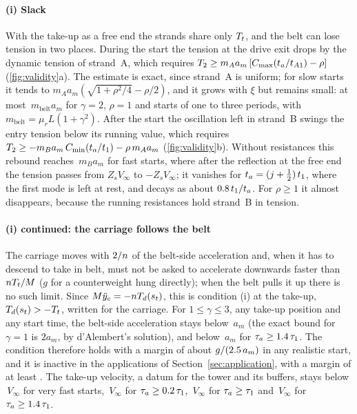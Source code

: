 \paragraph{(i) Slack} With the take-up as a free end the strands share only $T_t$, and the belt
can lose tension in two places. During the start the tension at the drive exit drops by the
dynamic tension of strand~A, which requires $T_2\ge m_Aa_m\,[C_\mathrm{max}(t_a/t_{A1})-\rho]$
(\cref{fig:validity}a). The estimate is exact, since strand~A is uniform; for slow starts it tends
to $m_Aa_m(\sqrt{1+\rho^2/4}-\rho/2)$, and it grows with $\xi$ but remains small: at most
\NumValidityExitMax\,$m_\mathrm{belt}a_m$ for $\gamma=2$, $\rho=1$ and starts of one to three
periods, with $m_\mathrm{belt}=\mu_rL(1+\gamma^2)$. After the start the oscillation left in
strand~B swings the entry tension below its running value, which requires
$T_2\ge-m_Ba_m\,C_\mathrm{min}(t_a/t_{1})-\rho\,m_Aa_m$ (\cref{fig:validity}b). Without
resistances this rebound reaches \NumReboundMax\,$m_Ba_m$ for fast starts, where after the
reflection at the free end the tension passes from $Z_sV_\infty$ to $-Z_sV_\infty$; it vanishes for
$t_a=(j+\tfrac12)\,t_{1}$, where the first mode is left at rest, and decays as about
$0.8\,t_{1}/t_a$. For $\rho\ge1$ it almost disappears, because the running resistances hold
strand~B in tension.

\paragraph{(i) continued: the carriage follows the belt} The carriage moves with
$2/n$ of the belt-side acceleration and, when it has to descend to take in belt, must not be
asked to accelerate downwards faster than $nT_t/M$ ($g$ for a counterweight hung
directly); when the belt pulls it up there is no such limit. Since $M\ddot y_c=-n
T_d(s_t)$, this is condition (i) at the take-up, $T_d(s_t)>-T_t$, written for the carriage. For
$1\le\gamma\le3$, any take-up position and any start time, the
belt-side acceleration stays below \NumTakeupAccEnvelope\,$a_m$ (the exact bound for $\gamma=1$ is
$2a_m$, by d'Alembert's solution), and below \NumTakeupAccSlow\,$a_m$ for
$\tau_a\ge1.4\,\tau_{1}$. The condition therefore holds with a margin of about
$g/(2.5\,a_m)$ in any realistic start, and it is inactive in the applications of
Section~\ref{sec:application}, with a margin of at least \NumAppAccelMarginMin. The take-up velocity, a datum for the tower and its buffers, stays
below \NumTakeupVelFast\,$V_\infty$ for very fast starts, \NumTakeupVelFifth\,$V_\infty$ for
$\tau_a\ge0.2\,\tau_{1}$, \NumTakeupVelOne\,$V_\infty$ for $\tau_a\ge\tau_{1}$ and
\NumTakeupVelOneFour\,$V_\infty$ for $\tau_a\ge1.4\,\tau_{1}$.

